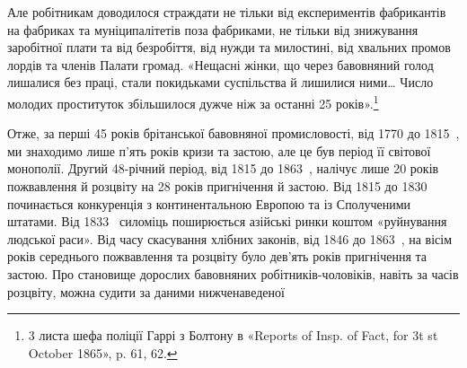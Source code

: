 \parcont{}  %
Але робітникам доводилося страждати не тільки від експериментів
фабрикантів на фабриках та муніципалітетів поза фабриками,
не тільки від знижування заробітної плати та від безробіття, від
нужди та милостині, від хвальних промов лордів та членів Палати
громад. «Нещасні жінки, що через бавовняний голод лишалися
без праці, стали покидьками суспільства й лишилися ними\dots{}
Число молодих проституток збільшилося дужче ніж за останні
25 років».\footnote{
3 листа шефа поліції Гаррі з Болтону в «Reports of Insp. of Fact,
for 3t st October 1865», p. 61, 62.
}

Отже, за перші 45 років брітанської бавовняної промисловості,
від 1770 до 1815~, ми знаходимо лише п’ять років кризи та застою,
але це був період її світової монополії. Другий 48-річний період,
від 1815 до 1863~, налічує лише 20 років пожвавлення
й розцвіту на 28 років пригнічення й застою. Від 1815 до 1830~
починається конкуренція з континентальною Европою та із
Сполученими штатами. Від 1833~ силоміць поширюється азійські
ринки коштом «руйнування людської раси». Від часу скасування
хлібних законів, від 1846 до 1863~, на вісім років середнього
пожвавлення та розцвіту було дев’ять років пригнічення
та застою. Про становище дорослих бавовняних робітників-чоловіків,
навіть за часів розцвіту, можна судити за даними нижченаведеної
